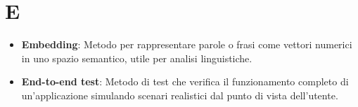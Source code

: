 \section{E}
\begin{itemize}
    \item \textbf{Embedding}: Metodo per rappresentare parole o frasi come vettori numerici in uno spazio semantico, utile per analisi linguistiche.
    \item \textbf{End-to-end test}: Metodo di test che verifica il funzionamento completo di un'applicazione simulando scenari realistici dal punto di vista dell'utente.
\end{itemize}
